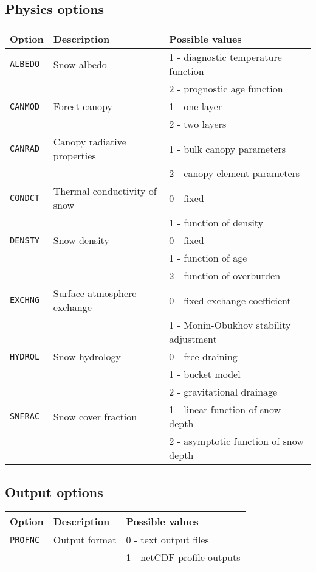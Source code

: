 \documentclass{article}
\begin{document}
\subsection{Physics options }
\begin{longtable}{|l|l|l|} \hline
Option       & Description & Possible values \\ \hline
{\tt ALBEDO} & Snow albedo
&   1 - diagnostic temperature function \\
& & 2 - prognostic age function         \\ \hline
{\tt CANMOD} & Forest canopy
&   1 - one layer                       \\
& & 2 - two layers                      \\ \hline
{\tt CANRAD} & Canopy radiative properties
&   1 - bulk canopy parameters          \\
& & 2 - canopy element parameters       \\ \hline
{\tt CONDCT} & Thermal conductivity of snow
&   0 - fixed                           \\
& & 1 - function of density             \\ \hline
{\tt DENSTY} & Snow density
&   0 - fixed                           \\
& & 1 - function of age                 \\
& & 2 - function of overburden          \\ \hline
{\tt EXCHNG} & Surface-atmosphere exchange
&   0 - fixed exchange coefficient      \\
& & 1 - Monin-Obukhov stability adjustment \\ \hline
{\tt HYDROL} & Snow hydrology
&   0 - free draining                   \\
& & 1 - bucket model                    \\
& & 2 - gravitational drainage          \\ \hline
{\tt SNFRAC} & Snow cover fraction
&   1 - linear function of snow depth      \\ 
& & 2 - asymptotic function of snow depth  \\ \hline
\end{longtable}

\subsection{Output options }
\begin{longtable}{|l|l|l|} \hline
Option       & Description & Possible values \\ \hline
{\tt PROFNC} & Output format
&   0 - text output files               \\
& & 1 - netCDF profile outputs          \\ \hline
\end{longtable}
\end{document}
